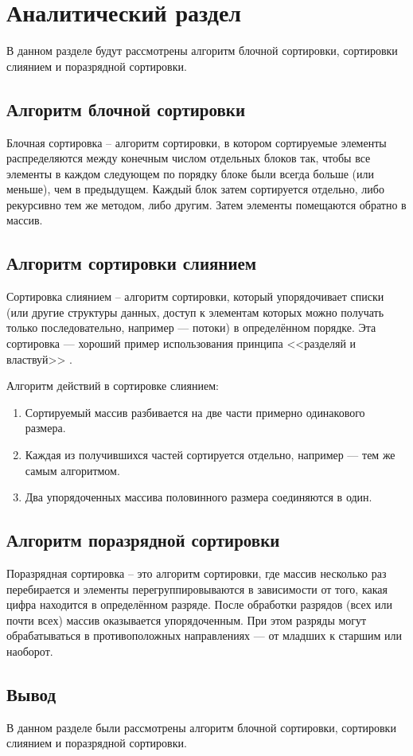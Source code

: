 \chapter{Аналитический раздел}

В данном разделе будут рассмотрены алгоритм блочной сортировки, сортировки слиянием и поразрядной сортировки.

\section{Алгоритм блочной сортировки}

Блочная сортировка \cite{_bucket} -- алгоритм сортировки, в котором сортируемые элементы распределяются между конечным числом отдельных блоков так, чтобы все элементы в каждом следующем по порядку блоке были всегда больше (или меньше), чем в предыдущем. Каждый блок затем сортируется отдельно, либо рекурсивно тем же методом, либо другим. Затем элементы помещаются обратно в массив. 

\section{Алгоритм сортировки слиянием}

Сортировка слиянием -- алгоритм сортировки, который упорядочивает списки (или другие структуры данных, доступ к элементам которых можно получать только последовательно, например — потоки) в определённом порядке. Эта сортировка — хороший пример использования принципа <<разделяй и властвуй>> \cite{merge}.

Алгоритм действий в сортировке слиянием:

\begin{enumerate}[label={\arabic*)}]
	\item Сортируемый массив разбивается на две части примерно одинакового размера.
	\item Каждая из получившихся частей сортируется отдельно, например — тем же самым алгоритмом.
	\item Два упорядоченных массива половинного размера соединяются в один.
\end{enumerate}


\section{Алгоритм поразрядной сортировки}

Поразрядная сортировка \cite{radix} -- это алгоритм сортировки, где массив
несколько раз перебирается и элементы перегруппировываются в зависимости от того, какая цифра находится в определённом разряде. После обработки разрядов (всех или почти всех) массив оказывается упорядоченным. При этом разряды могут обрабатываться в противоположных направлениях — от младших к старшим или наоборот.

\section*{Вывод}

В данном разделе были рассмотрены алгоритм блочной сортировки, сортировки слиянием и поразрядной сортировки.

